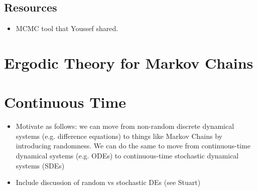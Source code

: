 \documentclass[12pt]{article}
\begin{document}
\subsection{Resources}
\begin{itemize}
\item MCMC tool that Youssef shared. 
\end{itemize}

\section{Ergodic Theory for Markov Chains}




\section{Continuous Time}
\begin{itemize}
\item Motivate as follows: we can move from non-random discrete dynamical systems (e.g. difference equations) to things like Markov Chains by introducing randomness. We can do the 
same to move from continuous-time dynamical systems (e.g. ODEs) to continuous-time stochastic dynamical systems (SDEs) 
\item Include discussion of random vs stochastic DEs (see Stuart)
\end{itemize}
\end{document}
